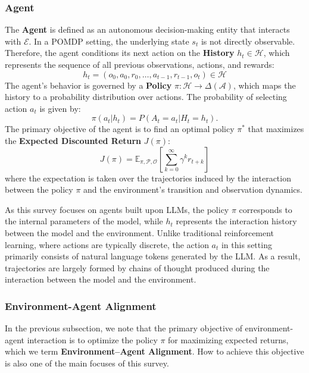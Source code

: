 \subsubsection{Agent}

The \textbf{Agent} is defined as an autonomous decision-making entity that interacts with $\mathcal{E}$. In a POMDP setting, the underlying state $s_t$ is not directly observable. Therefore, the agent conditions its next action on the \textbf{History} $h_t \in \mathcal{H}$, which represents the sequence of all previous observations, actions, and rewards:
\begin{equation}
    h_t = (o_0, a_0, r_0, \dots, a_{t-1}, r_{t-1}, o_t) \in \mathcal{H}
\end{equation}
The agent's behavior is governed by a \textbf{Policy} $\pi: \mathcal{H} \rightarrow \Delta(\mathcal{A})$, which maps the history to a probability distribution over actions. The probability of selecting action $a_t$ is given by:
\begin{equation}
    \pi(a_t | h_t) = P(A_t = a_t | H_t = h_t).
\end{equation}
The primary objective of the agent is to find an optimal policy $\pi^*$ that maximizes the \textbf{Expected Discounted Return} $J(\pi)$:
\begin{equation}
    J(\pi) = \mathbb{E}_{\pi, \mathcal{P}, \mathcal{O}} \left[ \sum_{k=0}^{\infty} \gamma^k r_{t+k} \right]
\end{equation}
where the expectation is taken over the trajectories induced by the interaction between the policy $\pi$ and the environment's transition and observation dynamics.

As this survey focuses on agents built upon LLMs, the policy $\pi$ corresponds to the internal parameters of the model, while $h_t$ represents the interaction history between the model and the environment. Unlike traditional reinforcement learning, where actions are typically discrete, the action $a_t$ in this setting primarily consists of natural language tokens generated by the LLM. As a result, trajectories are largely formed by chains of thought produced during the interaction between the model and the environment.

\subsubsection{Environment-Agent Alignment}
In the previous subsection, we note that the primary objective of environment-agent interaction is to optimize the policy $\pi$ for maximizing expected returns, which we term \textbf{Environment–Agent Alignment}. How to achieve this objective is also one of the main focuses of this survey.

